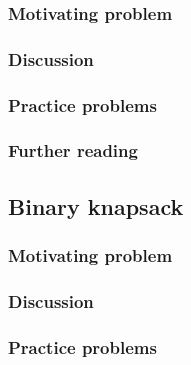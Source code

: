 \subsubsection*{Motivating problem}







\subsubsection*{Discussion}

\subsubsection*{Practice problems}

\subsubsection*{Further reading}

\subsection{Binary knapsack}

\subsubsection*{Motivating problem}







\subsubsection*{Discussion}

\subsubsection*{Practice problems}

